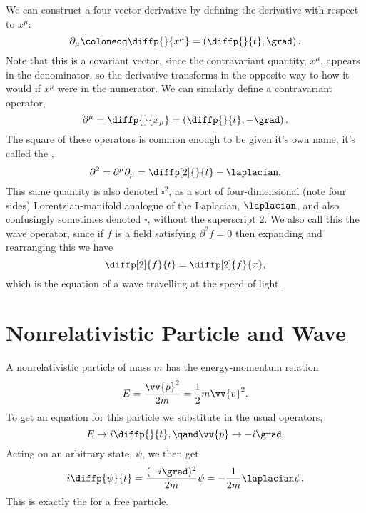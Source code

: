 \documentclass[fleqn]{NotesClass}
\newcommand{\dalembertian}{\partial^2}
\begin{document}
    We can construct a four-vector derivative by defining the derivative with respect to \(x^\mu\):
    \begin{equation}
        \partial_\mu \coloneqq \diffp{}{x^\mu} = \left( \diffp{}{t}, \grad \right).
    \end{equation}
    Note that this is a covariant vector, since the contravariant quantity, \(x^\mu\), appears in the denominator, so the derivative transforms in the opposite way to how it would if \(x^\mu\) were in the numerator.
    We can similarly define a contravariant operator,
    \begin{equation}
        \partial^\mu = \diffp{}{x_\mu} = \left( \diffp{}{t}, -\grad \right).
    \end{equation}
    The square of these operators is common enough to be given it's own name, it's called the ,
    \begin{equation}
        \dalembertian = \partial^\mu \partial_\mu = \diffp[2]{}{t} - \laplacian.
    \end{equation}
    This same quantity is also denoted \(\square^2\), as a sort of four-dimensional (note four sides) Lorentzian-manifold analogue of the Laplacian, \(\laplacian\), and also confusingly sometimes denoted \(\square\), without the superscript 2.
    We also call this the wave operator, since if \(f\) is a field satisfying \(\dalembertian f = 0\) then expanding and rearranging this we have
    \begin{equation}
        \diffp[2]{f}{t} = \diffp[2]{f}{x},
    \end{equation}
    which is the equation of a wave travelling at the speed of light.
    
    \section{Nonrelativistic Particle and Wave}
    A nonrelativistic particle of mass \(m\) has the energy-momentum relation
    \begin{equation}
        E = \frac{\vv{p}^2}{2m} = \frac{1}{2}m\vv{v}^2.
    \end{equation}
    To get an equation for this particle we substitute in the usual operators,
    \begin{equation}
        E \to i\diffp{}{t}, \qand \vv{p} \to -i\grad.
    \end{equation}
    Acting on an arbitrary state, \(\psi\), we then get
    \begin{equation}
        i\diffp{\psi}{t} = \frac{(-i\grad)^2}{2m} \psi = -\frac{1}{2m}\laplacian\psi.
    \end{equation}
    This is exactly the  for a free particle.
    
\end{document}
